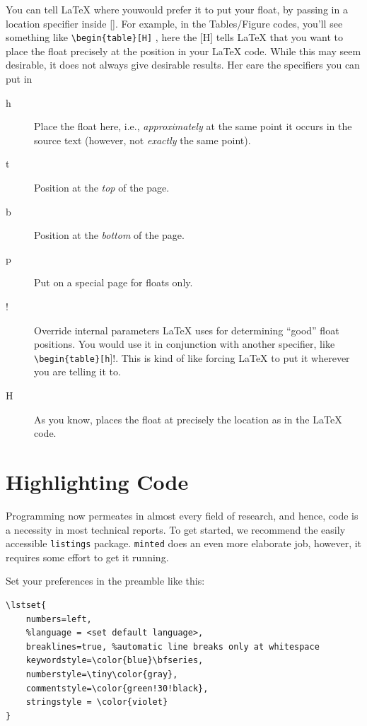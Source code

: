 \documentclass{article}
\theoremstyle{remark}
\begin{document}
    You can tell \LaTeX{} where youwould prefer it to put your float, by passing in a location
    specifier inside []. For example, in the Tables/Figure codes, you'll see something
    like \verb!\begin{table}[H]!  , here the [H] tells \LaTeX{} that you want to place the float
    precisely at the position in your \LaTeX{} code. While this may seem desirable,
    it does not always give desirable results. Her eare the specifiers you can put in
    \begin{description}
        \item[h] Place the float here, i.e., \emph{approximately} at the same point it occurs in the 
        source text (however, not \emph{exactly} the same point).
        \item[t] Position at the \emph{top} of the page.
        \item[b] Position at the \emph{bottom} of the page.
        \item[p] Put on a special page for floats only.
        \item[!] Override internal parameters \LaTeX{} uses for determining ``good'' float
            positions. You would use it in conjunction with another specifier, like \verb!\begin{table}[h!]!.
            This is kind of like forcing \LaTeX{} to put it wherever you are telling it to.
        \item[H] As you know, places the float at precisely the location as in the \LaTeX{} code.
    \end{description}

\clearpage
\section{Highlighting Code}
Programming now permeates in almost every field of research, and hence, code is a necessity in most technical reports. 
To get started, we recommend the easily accessible \verb!listings! package. \verb!minted! does an even more elaborate job, 
however, it requires some effort to get it running. \cite{greek}

Set your preferences in the preamble like this:
\begin{lstlisting}
\lstset{
    numbers=left,
    %language = <set default language>,
    breaklines=true, %automatic line breaks only at whitespace
    keywordstyle=\color{blue}\bfseries, 
    numberstyle=\tiny\color{gray},
    commentstyle=\color{green!30!black},
    stringstyle = \color{violet}
}
\end{lstlisting}
\end{document}
